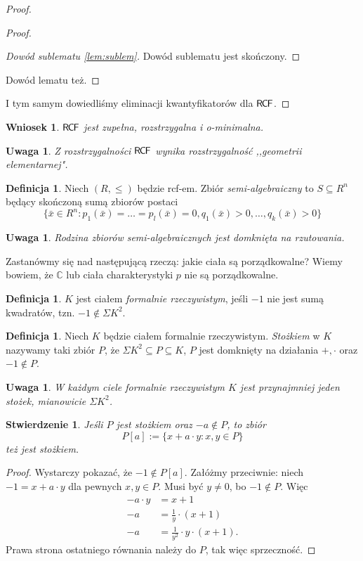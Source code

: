 \documentclass{article}
\newcommand{\C}{\mathbb{C}}
\theoremstyle{plain}
\newtheorem{stw}[thm]{Stwierdzenie}
\newtheorem{wn}[thm]{Wniosek}
\newtheorem{uw}[thm]{Uwaga}
\theoremstyle{definition}
\newtheorem{df}[thm]{Definicja}
\theoremstyle{remark}
\newcommand{\RCF}{\mathsf{R \mkern-1.7mu C \mkern-1.4mu F}}
\begin{document}
\begin{proof}
\begin{proof}
\begin{proof}[Dowód sublematu \ref{lem:sublem}]
			Dowód sublematu jest skończony.
		\end{proof}
			Dowód lematu też.
	\end{proof}
	I tym samym dowiedliśmy eliminacji kwantyfikatorów dla $\RCF$.
\end{proof}

\begin{wn}
	$ \RCF$ jest zupełna, rozstrzygalna i \textit{o}-minimalna.
\end{wn}

\begin{uw}
	 Z rozstrzygalności $ \RCF$ wynika rozstrzygalność ,,geometrii
	 elementarnej".
\end{uw}

\begin{df}
	 Niech $ (R, \leq)$ będzie rcf-em.
	 Zbiór \textit{semi-algebraiczny} to $ S \subseteq R^n$ będący skończoną
	 sumą zbiorów postaci
	 \[
		 \{\bar{x} \in R^n \colon p_1(\bar{x}) = \ldots = p_l(\bar{x})
		 = 0, q_1(\bar{x}) > 0, \ldots, q_k(\bar{x}) > 0 \}
	 \]
\end{df}

\begin{uw}
	 Rodzina zbiorów semi-algebraicznych jest domknięta na rzutowania.
\end{uw}



Zastanówmy się nad następującą rzeczą: jakie ciała są porządkowalne?
Wiemy bowiem, że $\C$ lub ciała charakterystyki $p$ nie są porządkowalne.

\begin{df}
	 $K$ jest ciałem \textit{formalnie rzeczywistym}, jeśli $-1$ nie jest
	 sumą kwadratów, tzn. $-1 \not \in \Sigma K^2$.
\end{df}
\begin{df}
   Niech $ K$ będzie ciałem formalnie rzeczywistym.
   \textit{Stożkiem} w $ K$ nazywamy taki zbiór $P$,
	 że $\Sigma K^2 \subseteq P \subseteq K$, $P$ jest domknięty na
	 działania $+, \cdot$ oraz $-1 \not \in P$.
\end{df}

\begin{uw}
	W każdym ciele formalnie rzeczywistym $K$ jest przynajmniej jeden
	stożek, mianowicie $\Sigma K^2$.
\end{uw}
\begin{stw}
	Jeśli $P$ jest stożkiem oraz $-a \not \in P$, to zbiór $$P[a] := \{x +
	a \cdot y \colon x, y \in P\}$$ też jest stożkiem.
\end{stw}
\begin{proof}
	Wystarczy pokazać, że $-1 \not \in P[a]$.
	Załóżmy przeciwnie: niech $-1 = x + a \cdot y$ dla pewnych $x, y \in P$.
	Musi być $y \neq 0$, bo $-1 \not \in P$.
	Więc
	\begin{align*}
		-a \cdot y &= x + 1 \\
		-a &= \frac{1}{y} \cdot (x + 1) \\
		-a &= \frac{1}{y^2} \cdot y \cdot (x + 1).
	\end{align*}
	Prawa strona ostatniego równania należy do $P$, tak więc sprzeczność.
\end{proof}
\end{document}
